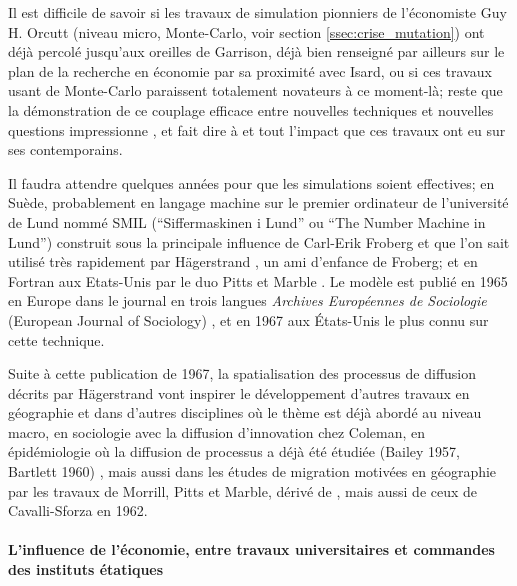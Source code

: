 Il est difficile de savoir si les travaux de simulation pionniers de l'économiste Guy H. Orcutt \autocites{Orcutt1957, Orcutt1960} (niveau micro, Monte-Carlo, voir section \ref{ssec:crise_mutation}) ont déjà percolé jusqu'aux oreilles de Garrison, déjà bien renseigné par ailleurs sur le plan de la recherche en économie par sa proximité avec Isard, ou si ces travaux usant de Monte-Carlo paraissent totalement novateurs à ce moment-là; reste que la démonstration de ce couplage efficace entre nouvelles techniques et nouvelles questions impressionne \autocite[120]{Unwin1992}, et fait dire à \textcite{Morril2005} et \textcite{Gould1970} tout l'impact que ces travaux ont eu sur ses contemporains.

Il faudra attendre quelques années pour que les simulations soient effectives; en Suède, probablement en langage machine sur le premier ordinateur de l'université de Lund nommé SMIL (\foreignquote{sweden}{Siffermaskinen i Lund} ou \foreignquote{english}{The Number Machine in Lund}) construit sous la principale influence de Carl-Erik Froberg et que l'on sait utilisé très rapidement par Hägerstrand , un ami d'enfance de Froberg; et en Fortran  aux Etats-Unis par le duo Pitts et Marble \autocites{Morril2005, Marble1972, Pitts1963}. Le modèle est publié en 1965 en Europe dans le journal en trois langues \textit{Archives Européennes de Sociologie} (European Journal of Sociology) \autocite{Hagerstrand1965}, et en 1967 \autocite{Hagerstrand1967a} aux États-Unis le plus connu sur cette technique.


Suite à cette publication de 1967, la spatialisation des processus de diffusion décrits par Hägerstrand vont inspirer le développement d'autres travaux en géographie et dans d'autres disciplines où le thème est déjà abordé au niveau macro, en sociologie avec la diffusion d'innovation chez Coleman, en épidémiologie \autocite{Cliff1981, Cliff2000} où la diffusion de processus a déjà été étudiée (Bailey 1957, Bartlett 1960) \autocite{Pitts1963, Morrill1968}, mais aussi dans les études de migration motivées en géographie par les travaux de Morrill, Pitts et Marble, dérivé de \autocite{Wolpert1965}, mais aussi de ceux de Cavalli-Sforza en 1962.

\paragraph{L'influence de l'économie, entre travaux universitaires et commandes des instituts étatiques}

